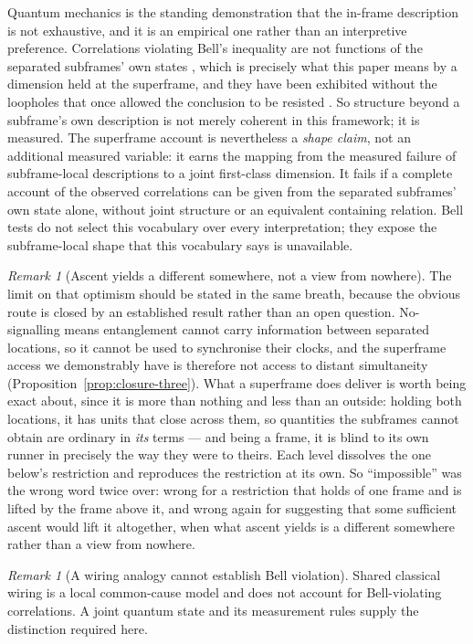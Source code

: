 \documentclass[11pt,a4paper]{article}
\theoremstyle{remark}\newtheorem{remark}[definition]{Remark}
\begin{document}
Quantum mechanics is the standing demonstration that the in-frame description is not exhaustive, and
it is an empirical one rather than an interpretive preference. Correlations violating Bell's
inequality are not functions of the separated subframes' own states \citep{bell1964}, which is
precisely what this paper means by a dimension held at the superframe, and they have been exhibited
without the loopholes that once allowed the conclusion to be resisted \citep{hensen2015}. So
structure beyond a subframe's own description is not merely coherent in this framework; it is
measured. The superframe account is nevertheless a \emph{shape claim}, not an additional measured
variable: it earns the mapping from the measured failure of subframe-local descriptions to a joint
first-class dimension. It fails if a complete account of the observed correlations can be given from
the separated subframes' own state alone, without joint structure or an equivalent containing
relation. Bell tests do not select this vocabulary over every interpretation; they expose the
subframe-local shape that this vocabulary says is unavailable.

\begin{remark}[Ascent yields a different somewhere, not a view from nowhere]\label{rem:ascent-different-somewhere}
The limit on that optimism should be stated in the same breath, because the obvious route is closed
by an established result rather than an open question. No-signalling means entanglement cannot carry
information between separated locations, so it cannot be used to synchronise their clocks, and the
superframe access we demonstrably have is therefore not access to distant simultaneity
(Proposition~\ref{prop:closure-three}). What a superframe does deliver is
worth being exact about, since it is more than nothing and less than an outside: holding both
locations, it has units that close across them, so quantities the subframes cannot obtain are
ordinary in \emph{its} terms --- and being a frame, it is blind to its own runner in precisely the way
they were to theirs. Each level dissolves the one below's restriction and reproduces the restriction
at its own. So ``impossible'' was the wrong word twice over: wrong for a restriction that holds of one
frame and is lifted by the frame above it, and wrong again for suggesting that some sufficient ascent
would lift it altogether, when what ascent yields is a different somewhere rather than a view from
nowhere.
\end{remark}

\begin{remark}[A wiring analogy cannot establish Bell violation]\label{rem:light-switch}
Shared classical wiring is a local common-cause model and does not account
for Bell-violating correlations. A joint quantum state and its measurement
rules supply the distinction required here.
\end{remark}
\end{document}
